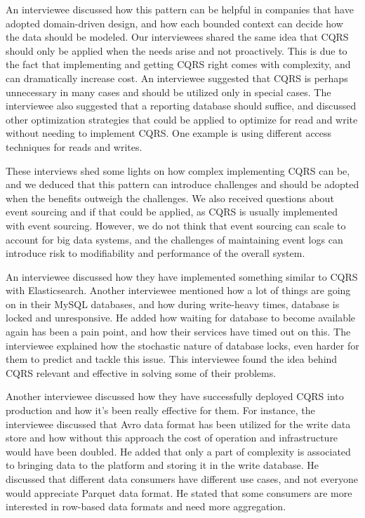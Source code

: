 \documentclass{bmcart}
\begin{document}
An interviewee discussed how this pattern can be helpful in companies that have adopted domain-driven design, and how each bounded context can decide how the data should be modeled. Our interviewees shared the same idea that CQRS should only be applied when the needs arise and not proactively. This is due to the fact that implementing and getting CQRS right comes with complexity, and can dramatically increase cost. An interviewee suggested that CQRS is perhaps unnecessary in many cases and should be utilized only in special cases. The interviewee also suggested that a reporting database should suffice, and discussed other optimization strategies that could be applied to optimize for read and write without needing to implement CQRS. One example is using different access techniques for reads and writes. 

These interviews shed some lights on how complex implementing CQRS can be, and we deduced that this pattern can introduce challenges and should be adopted when the benefits outweigh the challenges. We also received questions about event sourcing and if that could be applied, as CQRS is usually implemented with event sourcing. However, we do not think that event sourcing can scale to account for big data systems, and the challenges of maintaining event logs can introduce risk to modifiability and performance of the overall system. 


An interviewee discussed how they have implemented something similar to CQRS with Elasticsearch. Another interviewee mentioned how a lot of things are going on in their MySQL databases, and how during write-heavy times, database is locked and unresponsive. He added how waiting for database to become available again has been a pain point, and how their services have timed out on this. The interviewee explained how the stochastic nature of database locks, even harder for them to predict and tackle this issue. This interviewee found the idea behind CQRS relevant and effective in solving some of their problems. 

Another interviewee discussed how they have successfully deployed CQRS into production and how it's been really effective for them. For instance, the interviewee discussed that Avro data format has been utilized for the write data store and how without this approach the cost of operation and infrastructure would have been doubled. He added that only a part of complexity is associated to bringing data to the platform and storing it in the write database. He discussed that different data consumers have different use cases, and not everyone would appreciate Parquet data format. He stated that some consumers are more interested in row-based data formats and need more aggregation. 
\end{document}
